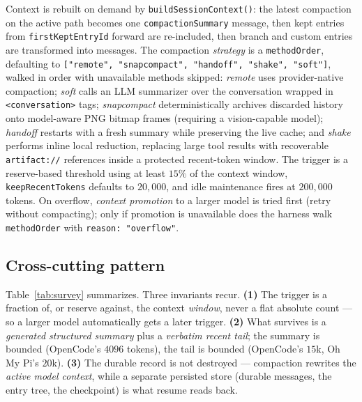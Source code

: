 \documentclass[11pt]{article}
\begin{document}
Context is rebuilt on demand by \texttt{buildSessionContext()}: the latest
compaction on the active path becomes one \texttt{compactionSummary} message,
then kept entries from \texttt{firstKeptEntryId} forward are re-included, then
branch and custom entries are transformed into messages. The compaction
\emph{strategy} is a \texttt{methodOrder}, defaulting to
\texttt{["remote", "snapcompact", "handoff", "shake", "soft"]}, walked in order
with unavailable methods skipped: \emph{remote} uses provider-native compaction;
\emph{soft} calls an LLM summarizer over the conversation wrapped in
\texttt{<conversation>} tags; \emph{snapcompact} deterministically archives
discarded history onto model-aware PNG bitmap frames (requiring a vision-capable
model); \emph{handoff} restarts with a fresh summary while preserving the live
cache; and \emph{shake} performs inline local reduction, replacing large tool
results with recoverable \texttt{artifact://} references inside a protected
recent-token window. The trigger is a reserve-based threshold using at least
$15\%$ of the context window, \texttt{keepRecentTokens} defaults to $20{,}000$,
and idle maintenance fires at $200{,}000$ tokens. On overflow, \emph{context
promotion} to a larger model is tried first (retry without compacting); only if
promotion is unavailable does the harness walk \texttt{methodOrder} with
\texttt{reason: "overflow"}.

\subsection{Cross-cutting pattern}

Table~\ref{tab:survey} summarizes. Three invariants recur. \textbf{(1)} The
trigger is a fraction of, or reserve against, the context \emph{window}, never a
flat absolute count --- so a larger model automatically gets a later trigger.
\textbf{(2)} What survives is a \emph{generated structured summary} plus a
\emph{verbatim recent tail}; the summary is bounded (OpenCode's $4096$ tokens),
the tail is bounded (OpenCode's $15$k, Oh My Pi's $20$k). \textbf{(3)} The
durable record is not destroyed --- compaction rewrites the \emph{active model
context}, while a separate persisted store (durable messages, the entry tree,
the checkpoint) is what resume reads back.
\end{document}
